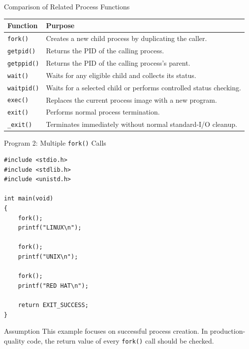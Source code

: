 \documentclass[aspectratio=169]{beamer}
\begin{document}
\begin{frame}{Comparison of Related Process Functions}

\begin{center}
\small
\begin{tabular}{|p{2.2cm}|p{8.8cm}|}
\hline
\textbf{Function} & \textbf{Purpose} \\
\hline
\texttt{fork()} &
Creates a new child process by duplicating the caller. \\
\hline
\texttt{getpid()} &
Returns the PID of the calling process. \\
\hline
\texttt{getppid()} &
Returns the PID of the calling process's parent. \\
\hline
\texttt{wait()} &
Waits for any eligible child and collects its status. \\
\hline
\texttt{waitpid()} &
Waits for a selected child or performs controlled status checking. \\
\hline
\texttt{exec()} &
Replaces the current process image with a new program. \\
\hline
\texttt{exit()} &
Performs normal process termination. \\
\hline
\texttt{\_exit()} &
Terminates immediately without normal standard-I/O cleanup. \\
\hline
\end{tabular}
\end{center}

\end{frame}

\begin{frame}[fragile]{Program 2: Multiple \texttt{fork()} Calls}

\begin{lstlisting}[style=cstyle]
#include <stdio.h>
#include <stdlib.h>
#include <unistd.h>

int main(void)
{
    fork();
    printf("LINUX\n");

    fork();
    printf("UNIX\n");

    fork();
    printf("RED HAT\n");

    return EXIT_SUCCESS;
}
\end{lstlisting}

\begin{alertblock}{Assumption}
This example focuses on successful process creation. In production-quality code,
the return value of every \texttt{fork()} call should be checked.
\end{alertblock}

\end{frame}
\end{document}
